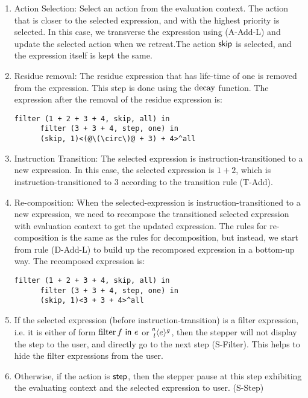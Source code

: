 \begin{enumerate}
  \item Action Selection: Select an action from the evaluation context. The action that is closer to the selected expression, and with the highest priority is selected. In this case, we transverse the expression using (A-Add-L) and update the selected action when we retreat.The action \(\ActSkip\) is selected, and the expression itself is kept the same.

  \item Residue removal: The residue expression that has life-time of one is removed from the expression. This step is done using the \(\Decay\) function. The expression after the removal of the residue expression is:
    \begin{lstlisting}[language=hazel]
      filter (1 + 2 + 3 + 4, skip, all) in
      filter (3 + 3 + 4, step, one) in
      (skip, 1)<(@\(\circ\)@ + 3) + 4>^all
    \end{lstlisting}
  \item Instruction Transition: The selected expression is instruction-transitioned to a new expression. In this case, the selected expression is \(1 + 2\), which is instruction-transitioned to \(3\) according to the transition rule (T-Add).

  \item Re-composition: When the selected-expression is instruction-transitioned to a new expression, we need to recompose the transitioned selected expression with evaluation context to get the updated expression. The rules for re-composition is the same as the rules for decomposition, but instead, we start from rule (D-Add-L) to build up the recomposed expression in a bottom-up way. The recomposed expression is:
    \begin{lstlisting}[language=hazel]
      filter (1 + 2 + 3 + 4, skip, all) in
      filter (3 + 3 + 4, step, one) in
      (skip, 1)<3 + 3 + 4>^all
    \end{lstlisting}

  \item If the selected expression (before instruction-transition) is a filter expression, i.e. it is either of form \(\Filter{f}{e}\) or \(\Residue{a}{g}{l}{e}\), then the stepper will not display the step to the user, and directly go to the next step (S-Filter). This helps to hide the filter expressions from the user.

  \item Otherwise, if the action is \(\ActStep\), then the stepper pause at this step exhibiting the evaluating context and the selected expression to user. (S-Step)


\end{enumerate}
